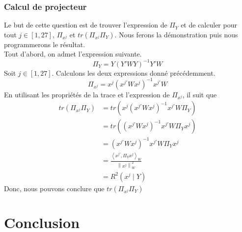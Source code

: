 \documentclass{article}
\begin{document}
\subsubsection{Calcul de projecteur}
Le but de cette question est de trouver l'expression
de $\Pi_Y$ et de calculer pour tout $j \in [1,27]$, $\Pi_{x^{j}}$ et $tr(\Pi_{x^{j}}\Pi_Y)$. Nous ferons la démonstration
puis nous programmerons le résultat. \\
Tout d'abord, on admet l'expression suivante.
\[
\Pi_Y = Y(Y'WY)^{-1}Y'W
\]
Soit $j \in [1,27]$. Calculons les deux expressions donné précédemment.
\[
\Pi_{x^j}= x^{j}(x^{j\prime}Wx^{j})^{-1}x^{j\prime}W
\]
En utilisant les propriétés de la trace et l'expression de $\Pi_{x^j}$, il suit que 
\begin{align*}
    tr(\Pi_{x^{j}}\Pi_Y) &= tr(x^{j}(x^{j\prime}Wx^{j})^{-1}x^{j\prime}W\Pi_Y) \\
    &=tr((x^{j\prime}Wx^{j})^{-1}x^{j\prime}W\Pi_Yx^{j})\\
    &=(x^{j\prime}Wx^{j})^{-1}x^{j\prime}W\Pi_Yx^{j}\\
    &= \frac{\left\langle x^{j\prime},\Pi_Yx^{j}\right\rangle_W }{\left\lVert x^j\right\rVert^2_W }\\
    &= R^2(x^j\mid Y )
\end{align*}
Donc, nous pouvons conclure que $tr(\Pi_{x^{j}}\Pi_Y)$ 


\newpage
\section{Conclusion}
\end{document}
